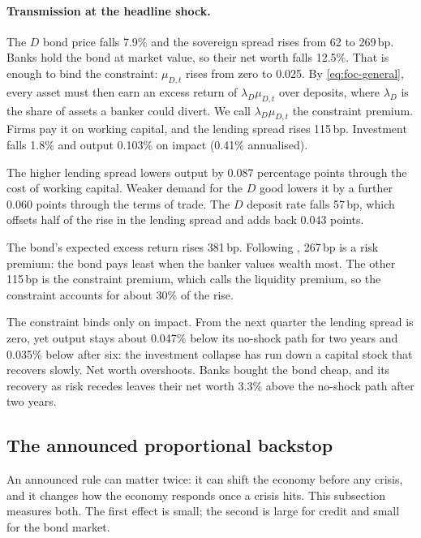 \paragraph{Transmission at the headline shock.}
\label{sec:res-transmission}
The $D$ bond price falls 7.9\% and the sovereign spread rises from 62 to 269\,bp. Banks hold the
bond at market value, so their net worth falls 12.5\%. That is enough to bind the constraint:
$\mu_{D,t}$ rises from zero to 0.025. By \eqref{eq:foc-general}, every asset must then earn an
excess return of $\lambda_D\mu_{D,t}$ over deposits, where $\lambda_D$ is the share of assets a
banker could divert. We call $\lambda_D\mu_{D,t}$ the constraint premium. Firms pay it on working
capital, and the lending spread rises 115\,bp. Investment falls 1.8\% and output 0.103\% on
impact (0.41\% annualised).

The higher lending spread lowers output by 0.087 percentage points through the cost of working
capital. Weaker demand for the $D$ good lowers it by a further 0.060 points through the terms of
trade. The $D$ deposit rate falls 57\,bp, which offsets half of the rise in the lending spread
and adds back 0.043 points.

The bond's expected excess return rises 381\,bp. Following \citet{bocola2016pass}, 267\,bp is a
risk premium: the bond pays least when the banker values wealth most. The other 115\,bp is the
constraint premium, which \citet{bocola2016pass} calls the liquidity premium, so the constraint
accounts for about 30\% of the rise.

The constraint binds only on impact. From the next quarter the lending spread is zero, yet output
stays about 0.047\% below its no-shock path for two years and 0.035\% below after six: the
investment collapse has run down a capital stock that recovers slowly. Net worth overshoots.
Banks bought the bond cheap, and its recovery as risk recedes leaves their net worth 3.3\% above
the no-shock path after two years.

\subsection{The announced proportional backstop}
\label{sec:res-announced}

An announced rule can matter twice: it can shift the economy before any crisis, and it changes
how the economy responds once a crisis hits. This subsection measures both. The first effect is
small; the second is large for credit and small for the bond market.

